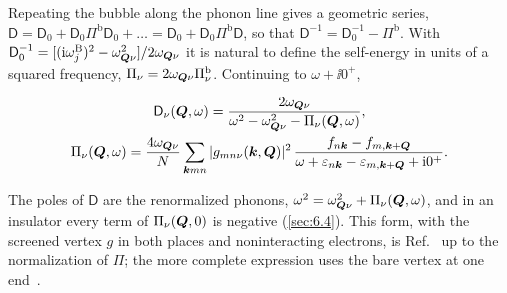 Repeating the bubble along the phonon line gives a geometric series, $\mathsf{D} = \mathsf{D}_0 + \mathsf{D}_0\Pi^{\mathrm{b}}\mathsf{D}_0 + \dots = \mathsf{D}_0 + \mathsf{D}_0\Pi^{\mathrm{b}}\mathsf{D}$, so that $\mathsf{D}^{-1} = \mathsf{D}_0^{-1} - \Pi^{\mathrm{b}}$. With $\mathsf{D}_0^{-1} = [(\mathrm{i}\omega^{\mathrm{B}}_j)^2 - \omega_{\bm{Q}\nu}^2]/2\omega_{\bm{Q}\nu}$ it is natural to define the self-energy in units of a squared frequency, $\Pi_\nu = 2\omega_{\bm{Q}\nu}\Pi^{\mathrm{b}}_\nu$. Continuing to $\omega + \ii0^+$,
\begin{keyresult}
\begin{gather}
  \mathsf{D}_\nu(\bm{Q},\omega) = \frac{2\omega_{\bm{Q}\nu}}{\omega^2 - \omega_{\bm{Q}\nu}^2 - \Pi_\nu(\bm{Q},\omega)} , \notag\\
  \Pi_\nu(\bm{Q},\omega) = \frac{4\omega_{\bm{Q}\nu}}{N}\sum_{\bm{k}mn}|g_{mn\nu}(\bm{k},\bm{Q})|^2\,\frac{f_{n\bm{k}} - f_{m,\bm{k}+\bm{Q}}}{\omega + \varepsilon_{n\bm{k}} - \varepsilon_{m,\bm{k}+\bm{Q}} + \mathrm{i}0^+} .
  \label{eq:D.17-Pi}
\end{gather}
\end{keyresult}
The poles of $\mathsf{D}$ are the renormalized phonons, $\omega^2 = \omega_{\bm{Q}\nu}^2 + \Pi_\nu(\bm{Q},\omega)$, and in an insulator every term of $\Pi_\nu(\bm{Q},0)$ is negative (\cref{sec:6.4}). This form, with the screened vertex $g$ in both places and noninteracting electrons, is Ref.~\cite[Eq.~(146) and the text before it]{giustino2017electron} up to the normalization of $\Pi$; the more complete expression uses the bare vertex at one end~\cite[Eq.~(145)]{giustino2017electron}.

